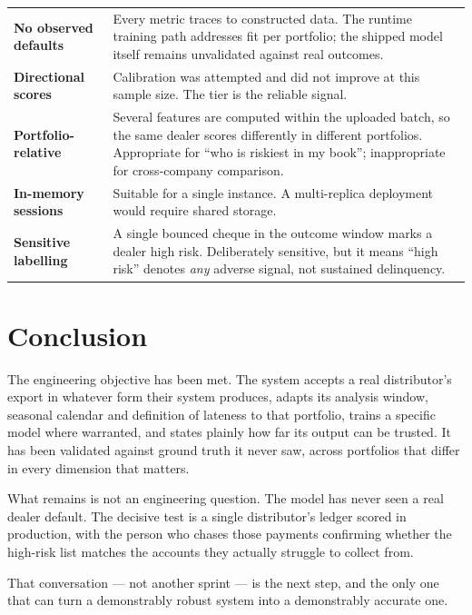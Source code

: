 \documentclass[11pt,a4paper]{article}
\newcommand{\lab}[1]{{\color{navy}\bfseries\footnotesize #1}}
\begin{document}
\begin{tabularx}{\textwidth}{@{}p{4.6cm}X@{}}
\lab{No observed defaults} & Every metric traces to constructed data. The
runtime training path addresses fit per portfolio; the shipped model itself
remains unvalidated against real outcomes. \\
\lab{Directional scores} & Calibration was attempted and did not improve at this
sample size. The tier is the reliable signal. \\
\lab{Portfolio-relative} & Several features are computed within the uploaded
batch, so the same dealer scores differently in different portfolios.
Appropriate for ``who is riskiest in my book''; inappropriate for cross-company
comparison. \\
\lab{In-memory sessions} & Suitable for a single instance. A multi-replica
deployment would require shared storage. \\
\lab{Sensitive labelling} & A single bounced cheque in the outcome window marks a
dealer high risk. Deliberately sensitive, but it means ``high risk'' denotes
\emph{any} adverse signal, not sustained delinquency. \\
\end{tabularx}

\section{Conclusion}

The engineering objective has been met. The system accepts a real distributor's
export in whatever form their system produces, adapts its analysis window,
seasonal calendar and definition of lateness to that portfolio, trains a
specific model where warranted, and states plainly how far its output can be
trusted. It has been validated against ground truth it never saw, across
portfolios that differ in every dimension that matters.

What remains is not an engineering question. The model has never seen a real
dealer default. The decisive test is a single distributor's ledger scored in
production, with the person who chases those payments confirming whether the
high-risk list matches the accounts they actually struggle to collect from.

\vspace{6pt}
\begin{keybox}
That conversation --- not another sprint --- is the next step, and the only one
that can turn a demonstrably robust system into a demonstrably accurate one.
\end{keybox}
\end{document}
